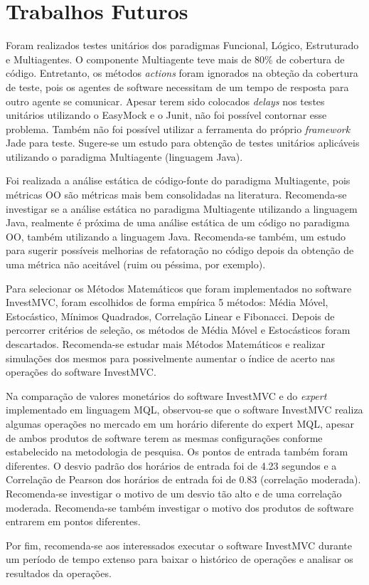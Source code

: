 \chapter{Trabalhos Futuros}

Foram realizados testes unitários dos paradigmas Funcional, Lógico, Estruturado e Multiagentes. O componente Multiagente teve mais de 80\% de cobertura de código. Entretanto, os métodos \textit{actions} foram ignorados na obteção da cobertura de teste, pois os agentes de software necessitam de um tempo de resposta para outro agente se comunicar. Apesar terem sido colocados \textit{delays}  nos testes unitários utilizando o EasyMock e o Junit, não foi possível contornar esse problema. Também não foi possível utilizar a ferramenta do próprio \textit{framework} Jade para teste. Sugere-se um estudo para obtenção de testes unitários aplicáveis utilizando o paradigma Multiagente (linguagem Java).

Foi realizada a análise estática de código-fonte do paradigma Multiagente, pois métricas OO são métricas mais bem consolidadas na literatura. Recomenda-se investigar se a análise estática no paradigma Multiagente utilizando a linguagem Java, realmente é próxima de uma análise estática de um código no paradigma OO, também utilizando a linguagem Java. Recomenda-se também, um estudo para sugerir possíveis melhorias de refatoração no código depois da obtenção de uma métrica não aceitável (ruim ou péssima, por exemplo).

Para selecionar os Métodos Matemáticos que foram implementados no software InvestMVC, foram escolhidos de forma empírica 5 métodos: Média Móvel, Estocástico, Mínimos Quadrados, Correlação Linear e Fibonacci. Depois de percorrer critérios de seleção, os métodos de Média Móvel e Estocásticos foram descartados. Recomenda-se estudar mais Métodos Matemáticos e realizar simulações dos mesmos para possivelmente aumentar o índice de acerto nas operações do software InvestMVC.

Na comparação de valores monetários do software InvestMVC e do \textit{expert} implementado em linguagem MQL, observou-se que o software InvestMVC realiza algumas operações no mercado em um horário diferente do expert MQL, apesar de ambos produtos de software terem as mesmas configurações conforme estabelecido na metodologia de pesquisa. Os pontos de entrada também foram diferentes. O desvio padrão dos horários de entrada foi de 4.23 segundos e a Correlação de Pearson dos horários de entrada foi de 0.83 (correlação moderada). Recomenda-se investigar o motivo de um desvio tão alto e de uma correlação moderada. Recomenda-se também investigar o motivo dos produtos de software entrarem em pontos diferentes. 

Por fim, recomenda-se aos interessados executar o software InvestMVC durante um período de tempo extenso para baixar o histórico de operações e analisar os resultados da operações.
